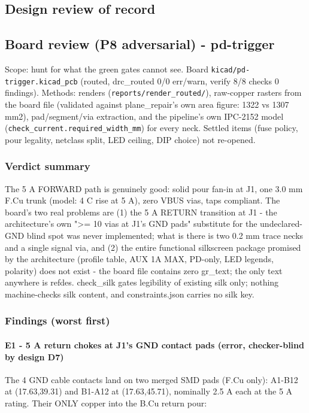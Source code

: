\documentclass[11pt,a4paper]{article}
\begin{document}
\subsection*{Design review of record}
\subsection*{Board review (P8 adversarial) - pd-trigger}
Scope: hunt for what the green gates cannot see. Board \texttt{kicad/pd-trigger.kicad\_pcb} (routed, drc\_routed 0/0 err/warn, verify 8/8 checks 0 findings). Methods: renders (\texttt{reports/render\_routed/}), raw-copper rasters from the board file (validated against plane\_repair's own area figure: 1322 vs 1307 mm2), pad/segment/via extraction, and the pipeline's own IPC-2152 model (\texttt{check\_current.required\_width\_mm}) for every neck. Settled items (fuse policy, pour legality, netclass split, LED ceiling, DIP choice) not re-opened.

\subsubsection*{Verdict summary}
The 5 A FORWARD path is genuinely good: solid pour fan-in at J1, one 3.0 mm F.Cu trunk (model: 4 C rise at 5 A), zero VBUS vias, taps compliant. The board's two real problems are (1) the 5 A RETURN transition at J1 - the architecture's own "\textgreater{}= 10 vias at J1's GND pads" substitute for the undeclared-GND blind spot was never implemented; what is there is two 0.2 mm trace necks and a single signal via, and (2) the entire functional silkscreen package promised by the architecture (profile table, AUX 1A MAX, PD-only, LED legends, polarity) does not exist - the board file contains zero gr\_text; the only text anywhere is refdes. check\_silk gates legibility of existing silk only; nothing machine-checks silk content, and constraints.json carries no silk key.

\subsubsection*{Findings (worst first)}
\paragraph*{E1 - 5 A return chokes at J1's GND contact pads (error, checker-blind by design D7)}
The 4 GND cable contacts land on two merged SMD pads (F.Cu only): A1-B12 at (17.63,39.31) and B1-A12 at (17.63,45.71), nominally 2.5 A each at the 5 A rating. Their ONLY copper into the B.Cu return pour:
\end{document}
